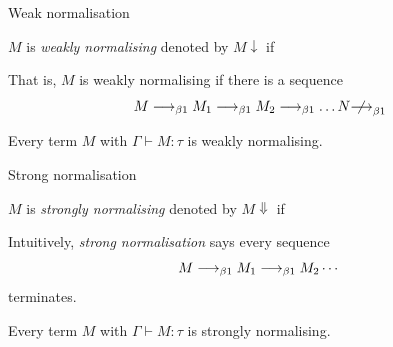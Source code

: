 \begin{frame}{Weak normalisation}
  \begin{definition}
    $M$ is \emph{weakly normalising} denoted by $M\downarrow$ if 
    \begin{multicols}{2}
      \begin{prooftree}
      \end{prooftree}
      \columnbreak
      \begin{prooftree}
      \end{prooftree}
    \end{multicols}
  \end{definition}
  That is, $M$ is weakly normalising if there is a sequence
  \[
    M \onereduce M_1 \onereduce M_2 \onereduce \dots N \notonereduce 
  \]
  \begin{theorem}
    Every term $M$ with $\Gamma \vdash M : \tau$ is weakly normalising.
  \end{theorem}

\end{frame}

\begin{frame}{Strong normalisation}
  \begin{definition}
    $M$ is \emph{strongly normalising} denoted by $M \Downarrow$ if 
    \begin{prooftree}
    \end{prooftree}
    
  \end{definition}
  Intuitively, \emph{strong normalisation} says every sequence
    \[
      M \onereduce M_1 \onereduce M_2 \cdots
    \]
  terminates.
  \begin{theorem}
    Every term $M$ with $\Gamma \vdash M : \tau$ is strongly normalising.
  \end{theorem}
  
\end{frame}

